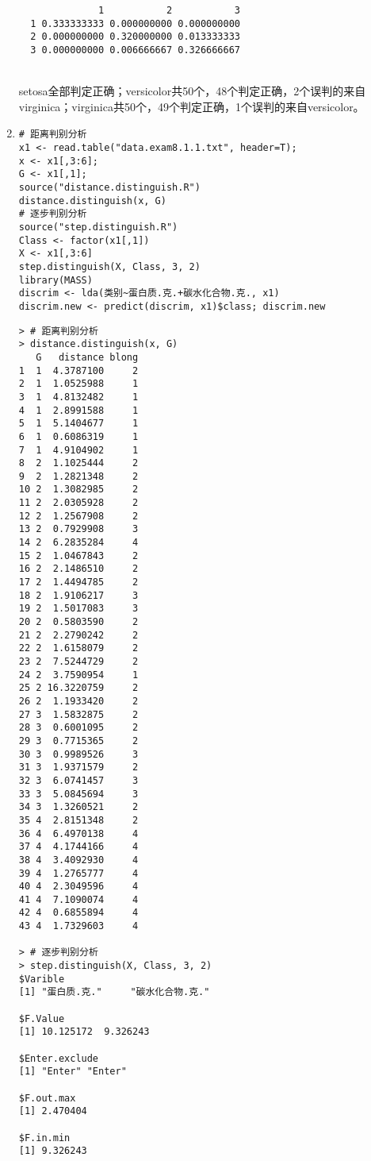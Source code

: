 \begin{enumerate}
\begin{lstlisting}
              1           2           3
  1 0.333333333 0.000000000 0.000000000
  2 0.000000000 0.320000000 0.013333333
  3 0.000000000 0.006666667 0.326666667
\end{lstlisting}
        \summary\\
        setosa全部判定正确；versicolor共50个，48个判定正确，2个误判的来自virginica；virginica共50个，49个判定正确，1个误判的来自versicolor。
        \item
        \code
\begin{lstlisting}
# 距离判别分析
x1 <- read.table("data.exam8.1.1.txt", header=T);
x <- x1[,3:6];
G <- x1[,1];
source("distance.distinguish.R")
distance.distinguish(x, G)
# 逐步判别分析
source("step.distinguish.R")
Class <- factor(x1[,1])
X <- x1[,3:6]
step.distinguish(X, Class, 3, 2)
library(MASS)
discrim <- lda(类别~蛋白质.克.+碳水化合物.克., x1)
discrim.new <- predict(discrim, x1)$class; discrim.new
\end{lstlisting}
        \out
\begin{lstlisting}
> # 距离判别分析
> distance.distinguish(x, G)
   G   distance blong
1  1  4.3787100     2
2  1  1.0525988     1
3  1  4.8132482     1
4  1  2.8991588     1
5  1  5.1404677     1
6  1  0.6086319     1
7  1  4.9104902     1
8  2  1.1025444     2
9  2  1.2821348     2
10 2  1.3082985     2
11 2  2.0305928     2
12 2  1.2567908     2
13 2  0.7929908     3
14 2  6.2835284     4
15 2  1.0467843     2
16 2  2.1486510     2
17 2  1.4494785     2
18 2  1.9106217     3
19 2  1.5017083     3
20 2  0.5803590     2
21 2  2.2790242     2
22 2  1.6158079     2
23 2  7.5244729     2
24 2  3.7590954     1
25 2 16.3220759     2
26 2  1.1933420     2
27 3  1.5832875     2
28 3  0.6001095     2
29 3  0.7715365     2
30 3  0.9989526     3
31 3  1.9371579     2
32 3  6.0741457     3
33 3  5.0845694     3
34 3  1.3260521     2
35 4  2.8151348     2
36 4  6.4970138     4
37 4  4.1744166     4
38 4  3.4092930     4
39 4  1.2765777     4
40 4  2.3049596     4
41 4  7.1090074     4
42 4  0.6855894     4
43 4  1.7329603     4

> # 逐步判别分析
> step.distinguish(X, Class, 3, 2)
$Varible
[1] "蛋白质.克."     "碳水化合物.克."

$F.Value
[1] 10.125172  9.326243

$Enter.exclude
[1] "Enter" "Enter"

$F.out.max
[1] 2.470404

$F.in.min
[1] 9.326243


\end{lstlisting}
\end{enumerate}
